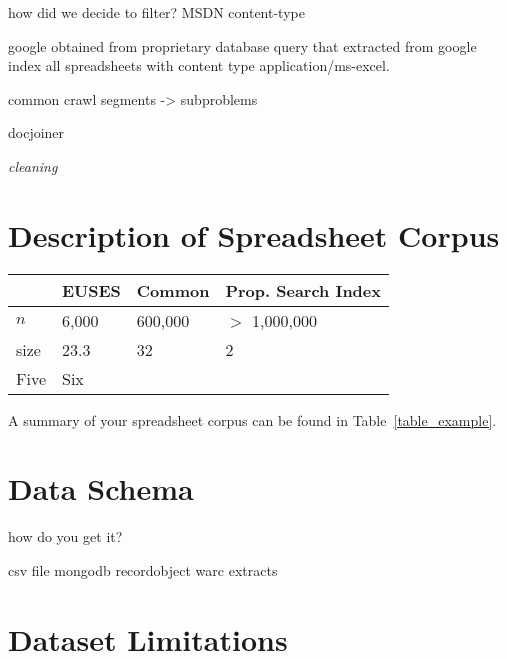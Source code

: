 \documentclass[conference]{IEEEtran}
\begin{document}
how did we decide to filter? MSDN content-type


google obtained from proprietary database query that extracted from google index all spreadsheets with content type application/ms-excel.

common crawl
segments -> subproblems

docjoiner

\blindtext[3]
\blindtext[3]

\emph{cleaning}

\section{Description of Spreadsheet Corpus}

\begin{table*}[!t]
\caption{A comparison of the EUSES, Common Crawl Index, and Proprietary Index\label{table_example}}
\centering
\begin{tabular}{llll}
\toprule
& \textbf{EUSES} & \textbf{Common} & \textbf{Prop. Search Index}\\
\midrule
$n$ & 6,000 & 600,000 & $>$ 1,000,000\\
size & 23.3 & 32 & 2\\
Five & Six\\
\bottomrule
\end{tabular}
\end{table*}



A summary of your spreadsheet corpus can be found in Table~\ref{table_example}.

\section{Data Schema}

how do you get it?

csv file
mongodb recordobject warc extracts




\section{Dataset Limitations}
\end{document}
